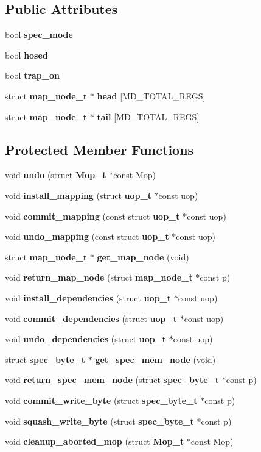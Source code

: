 \subsection*{Public Attributes}
\begin{CompactItemize}
\item 
bool {\bf spec\_\-mode}
\item 
bool {\bf hosed}
\item 
bool {\bf trap\_\-on}
\item 
struct {\bf map\_\-node\_\-t} $\ast$ {\bf head} [MD\_\-TOTAL\_\-REGS]
\item 
struct {\bf map\_\-node\_\-t} $\ast$ {\bf tail} [MD\_\-TOTAL\_\-REGS]
\end{CompactItemize}
\subsection*{Protected Member Functions}
\begin{CompactItemize}
\item 
void {\bf undo} (struct {\bf Mop\_\-t} $\ast$const Mop)
\item 
void {\bf install\_\-mapping} (struct {\bf uop\_\-t} $\ast$const uop)
\item 
void {\bf commit\_\-mapping} (const struct {\bf uop\_\-t} $\ast$const uop)
\item 
void {\bf undo\_\-mapping} (const struct {\bf uop\_\-t} $\ast$const uop)
\item 
struct {\bf map\_\-node\_\-t} $\ast$ {\bf get\_\-map\_\-node} (void)
\item 
void {\bf return\_\-map\_\-node} (struct {\bf map\_\-node\_\-t} $\ast$const p)
\item 
void {\bf install\_\-dependencies} (struct {\bf uop\_\-t} $\ast$const uop)
\item 
void {\bf commit\_\-dependencies} (struct {\bf uop\_\-t} $\ast$const uop)
\item 
void {\bf undo\_\-dependencies} (struct {\bf uop\_\-t} $\ast$const uop)
\item 
struct {\bf spec\_\-byte\_\-t} $\ast$ {\bf get\_\-spec\_\-mem\_\-node} (void)
\item 
void {\bf return\_\-spec\_\-mem\_\-node} (struct {\bf spec\_\-byte\_\-t} $\ast$const p)
\item 
void {\bf commit\_\-write\_\-byte} (struct {\bf spec\_\-byte\_\-t} $\ast$const p)
\item 
void {\bf squash\_\-write\_\-byte} (struct {\bf spec\_\-byte\_\-t} $\ast$const p)
\item 
void {\bf cleanup\_\-aborted\_\-mop} (struct {\bf Mop\_\-t} $\ast$const Mop)
\end{CompactItemize}
